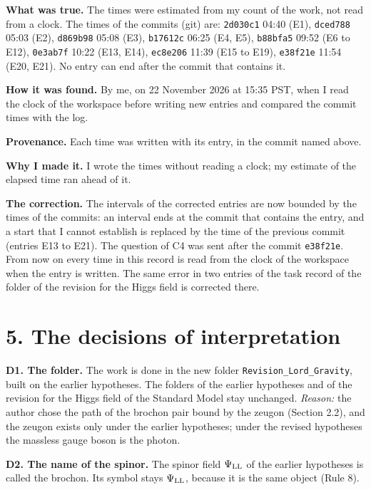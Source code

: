 \documentclass[
  10pt,
]{article}
\begin{document}
\textbf{What was true.} The times were estimated from my count of the
work, not read from a clock. The times of the commits (git) are:
\texttt{2d030c1} 04:40 (E1), \texttt{dced788} 05:03 (E2),
\texttt{d869b98} 05:08 (E3), \texttt{b17612c} 06:25 (E4, E5),
\texttt{b88bfa5} 09:52 (E6 to E12), \texttt{0e3ab7f} 10:22 (E13, E14),
\texttt{ec8e206} 11:39 (E15 to E19), \texttt{e38f21e} 11:54 (E20, E21).
No entry can end after the commit that contains it.

\textbf{How it was found.} By me, on 22 November 2026 at 15:35 PST, when
I read the clock of the workspace before writing new entries and
compared the commit times with the log.

\textbf{Provenance.} Each time was written with its entry, in the commit
named above.

\textbf{Why I made it.} I wrote the times without reading a clock; my
estimate of the elapsed time ran ahead of it.

\textbf{The correction.} The intervals of the corrected entries are now
bounded by the times of the commits: an interval ends at the commit that
contains the entry, and a start that I cannot establish is replaced by
the time of the previous commit (entries E13 to E21). The question of C4
was sent after the commit \texttt{e38f21e}. From now on every time in
this record is read from the clock of the workspace when the entry is
written. The same error in two entries of the task record of the folder
of the revision for the Higgs field is corrected there.

\hypertarget{the-decisions-of-interpretation}{%
\section{5. The decisions of
interpretation}\label{the-decisions-of-interpretation}}

\textbf{D1. The folder.} The work is done in the new folder
\texttt{Revision\_Lord\_Gravity}, built on the earlier hypotheses. The
folders of the earlier hypotheses and of the revision for the Higgs
field of the Standard Model stay unchanged. \emph{Reason:} the author
chose the path of the brochon pair bound by the zeugon (Section 2.2),
and the zeugon exists only under the earlier hypotheses; under the
revised hypotheses the massless gauge boson is the photon.

\textbf{D2. The name of the spinor.} The spinor field \(\Psi_{\rm LL}\)
of the earlier hypotheses is called the brochon. Its symbol stays
\(\Psi_{\rm LL}\), because it is the same object (Rule 8).
\end{document}
